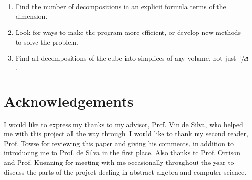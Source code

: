 \documentclass[12pt]{scrippsposter}
\begin{document}
\begin{poster}
\begin{enumerate}
\item Find the number of decompositions in an explicit formula terms of the dimension.
\item Look for ways to make the program more efficient, or develop new methods to solve the problem.
\item Find all decompositions of the cube into simplices of any volume, not just $\sfrac{1}{d!}$.
\end{enumerate}

\section{Acknowledgements}
I would like to express my thanks to my advisor, Prof. Vin de Silva, who helped me with this project all the way through. I would like to thank my second reader, Prof. Towse for reviewing this paper and giving his comments, in addition to introducing me to Prof. de Silva in the first place. Also thanks to Prof. Orrison and Prof. Kuenning for meeting with me occasionally throughout the year to discuss the parts of the project dealing in abstract algebra and computer science.

\end{poster}
\end{document}
